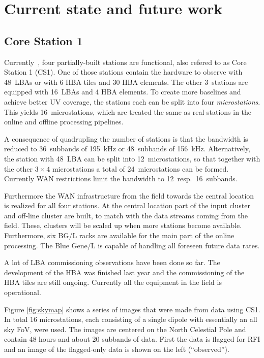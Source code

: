 \documentclass[journal]{IEEEtran}
\begin{document}
\section{Current state and future work}

\subsection{Core Station 1}
Currently~\cite{gunst:06}, four partially-built stations are functional, also refered to as Core Station 1 (CS1). One of those stations contain the hardware to observe with 48~LBAs or with 6 HBA tiles and 30 HBA elements. The other 3~stations are equipped with 16~LBAs and 4 HBA elements.
To create more baselines and achieve better UV coverage, the stations each can be split into four {\em microstations}.
This yields 16~microstations, which are treated the same as real stations in the online and offline processing pipelines.

A consequence of quadrupling the number of stations is that the bandwidth
is reduced to 36~subbands of 195~kHz or 48~subbands of 156~kHz.
Alternatively, the station with 48~LBA can be split into 12~microstations,
so that together with the other $3\times4$ microstations a total of
24~microstations can be formed. Currently WAN restrictions limit the bandwidth to 12~resp.\ 16~subbands.

Furthermore the WAN infrastructure from the field towards the central location is realized for all four stations. At the central location part of the input cluster and off-line cluster are built, to match with the data streams coming from the field. These, clusters will be scaled up when more stations become available. Furthermore, six BG/L racks are available for the main part of the online processing. The Blue Gene/L is capable of handling all foreseen future data rates.

A lot of LBA commissioning observations have been done so far. The development of the HBA was finished last year and the commissioning of the HBA tiles are still ongoing. Currently all the equipment in the field is operational.

Figure \ref{fig:skymap} shows a series of images that were made from data using CS1. In total 16 microstations, each consisting of a single dipole with essentially an all sky FoV, were used. The images are centered on the North Celestial Pole and contain 48 hours and about 20 subbands of data. First the data is flagged for RFI and an image of the flagged-only data is shown on the left (``observed''). 
\end{document}
